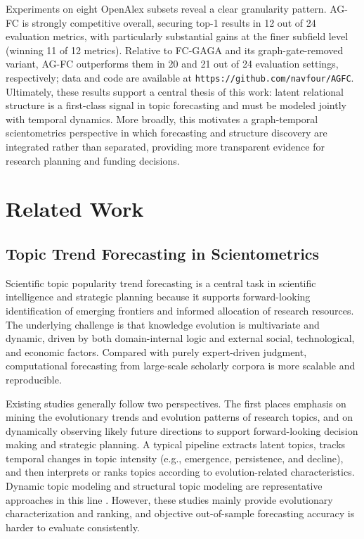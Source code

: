 \documentclass[runningheads]{llncs}
\newcommand{\OpenAlex}{\mbox{OpenAlex}}
\begin{document}
Experiments on eight \OpenAlex{} subsets reveal a clear granularity pattern. AG-FC is strongly competitive overall, securing top-1 results in 12 out of 24 evaluation metrics, with particularly substantial gains at the finer subfield level (winning 11 of 12 metrics). Relative to FC-GAGA and its graph-gate-removed variant, AG-FC outperforms them in 20 and 21 out of 24 evaluation settings, respectively; data and code are available at \texttt{https://github.com/navfour/AGFC}.
Ultimately, these results support a central thesis of this work: latent relational structure is a first-class signal in topic forecasting and must be modeled jointly with temporal dynamics. More broadly, this motivates a graph-temporal scientometrics perspective in which forecasting and structure discovery are integrated rather than separated, providing more transparent evidence for research planning and funding decisions.

\section{Related Work}
\subsection{Topic Trend Forecasting in Scientometrics}
Scientific topic popularity trend forecasting is a central task in scientific intelligence and strategic planning because it supports forward-looking identification of emerging frontiers and informed allocation of research resources. The underlying challenge is that knowledge evolution is multivariate and dynamic, driven by both domain-internal logic and external social, technological, and economic factors. Compared with purely expert-driven judgment, computational forecasting from large-scale scholarly corpora is more scalable and reproducible.

Existing studies generally follow two perspectives. The first places emphasis on mining the evolutionary trends and evolution patterns of research topics, and on dynamically observing likely future directions to support forward-looking decision making and strategic planning. A typical pipeline extracts latent topics, tracks temporal changes in topic intensity (e.g., emergence, persistence, and decline), and then interprets or ranks topics according to evolution-related characteristics. Dynamic topic modeling and structural topic modeling are representative approaches in this line \cite{lou2023diversity,kraus2023moon}. However, these studies mainly provide evolutionary characterization and ranking, and objective out-of-sample forecasting accuracy is harder to evaluate consistently.
\end{document}
